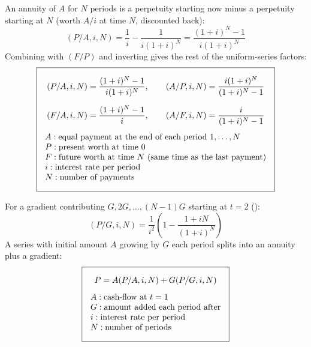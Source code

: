 \begin{definition}
    An annuity of $A$ for $N$ periods is a perpetuity starting now minus a
    perpetuity starting at $N$ (worth $A/i$ at time $N$, discounted back):
    \[(P/A,i,N) = \frac{1}{i}-\frac{1}{i(1+i)^N}
    = \frac{(1+i)^N - 1}{i(1+i)^N}\]
    Combining with $(F/P)$ and inverting gives the rest of the uniform-series factors:
    \[\boxed{\begin{gathered}
        (P/A,i,N) = \frac{(1+i)^N - 1}{i(1+i)^N}, \qquad (A/P,i,N) = \frac{i(1+i)^N}{(1+i)^N-1}\\[6pt]
        (F/A,i,N) = \frac{(1+i)^N-1}{i}, \qquad (A/F,i,N) = \frac{i}{(1+i)^N-1}\\[4pt]
        \begin{array}{@{}l@{}}
            A: \text{equal payment at the end of each period } 1,\dots,N\\
            P: \text{present worth at time } 0\\
            F: \text{future worth at time } N \text{ (same time as the last payment)}\\
            i: \text{interest rate per period}\\
            N: \text{number of payments}
        \end{array}
    \end{gathered}}\]
\end{definition}

\begin{definition}
    For a gradient contributing $G,2G,\dots,(N-1)G$ starting at $t=2$
    ():
    \[(P/G,i,N) = \frac{1}{i^2}\left(1-\frac{1+iN}{(1+i)^N}\right)\]
    A series with initial amount $A$ growing by $G$ each period splits
    into an annuity plus a gradient:
    \[\boxed{\begin{gathered}
        P = A(P/A,i,N) + G(P/G,i,N)\\[4pt]
        \begin{array}{@{}l@{}}
            A: \text{cash-flow at } t=1\\
            G: \text{amount added each period after}\\
            i: \text{interest rate per period}\\
            N: \text{number of periods}
        \end{array}
    \end{gathered}}\]
\end{definition}


